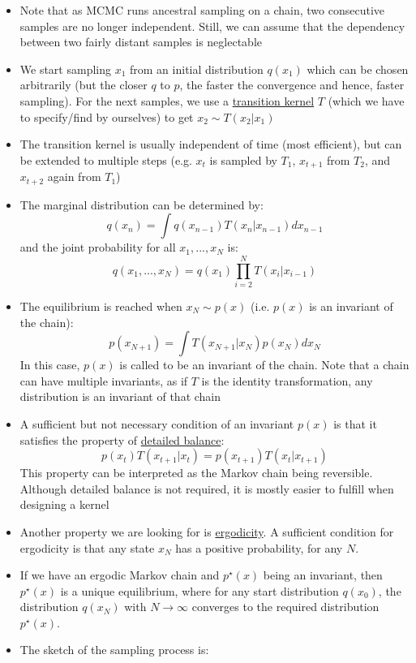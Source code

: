 \begin{itemize}
\begin{figure}[ht!]
{			;
			;
			;
			;
			;
			;
		}
	\end{figure}
	\item Note that as MCMC runs ancestral sampling on a chain, two consecutive samples are no longer independent. Still, we can assume that the dependency between two fairly distant samples is neglectable
	\item We start sampling $x_1$ from an initial distribution $q(x_1)$ which can be chosen arbitrarily (but the closer $q$ to $p$, the faster the convergence and hence, faster sampling). For the next samples, we use a \underline{transition kernel} $T$ (which we have to specify/find by ourselves) to get $x_2\sim T(x_2|x_1)$
	\item The transition kernel is usually independent of time (most efficient), but can be extended to multiple steps (e.g. $x_t$ is sampled by $T_1$, $x_{t+1}$ from $T_2$, and $x_{t+2}$ again from $T_1$)
	\item The marginal distribution can be determined by:
	$$q(x_{n}) = \int q(x_{n-1})T(x_{n}|x_{n-1})dx_{n-1}$$
	and the joint probability for all $x_1,...,x_N$ is:
	$$q(x_1,...,x_N) = q(x_1)\prod_{i=2}^{N}T(x_i|x_{i-1})$$
	\item The equilibrium is reached when $x_N\sim p(x)$ (i.e. $p(x)$ is an invariant of the chain):
	$$p(x_{N+1}) = \int T(x_{N+1}|x_N)p(x_N)dx_N$$ 
	In this case, $p(x)$ is called to be an invariant of the chain. Note that a chain can have multiple invariants, as if $T$ is the identity transformation, any distribution is an invariant of that chain
	\item A sufficient but not necessary condition of an invariant $p(x)$ is that it satisfies the property of \underline{detailed balance}:
	$$p(x_t)T(x_{t+1}|x_t) = p(x_{t+1})T(x_t|x_{t+1})$$
	This property can be interpreted as the Markov chain being reversible. Although detailed balance is not required, it is mostly easier to fulfill when designing a kernel
	\item Another property we are looking for is \underline{ergodicity}. A sufficient condition for ergodicity is that any state $x_N$ has a positive probability, for any $N$.
	\item If we have an ergodic Markov chain and $p^{\star}(x)$ being an invariant, then $p^{\star}(x)$ is a unique equilibrium, where for any start distribution $q(x_0)$, the distribution $q(x_N)$ with $N\to\infty$ converges to the required distribution $p^{\star}(x)$.
	\item The sketch of the sampling process is:
	

\end{itemize}
